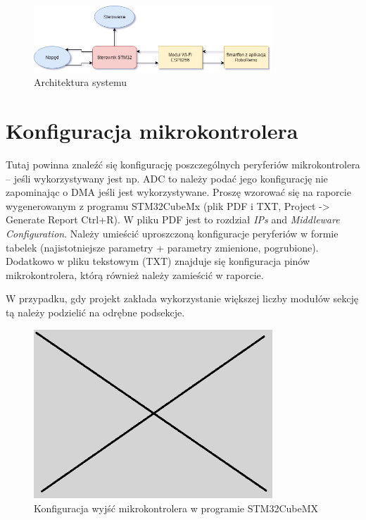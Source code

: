 \documentclass[10pt, a4paper]{article}
\begin{document}
\begin{figure}[H]
	\centering
	\includegraphics[width=0.8\textwidth]{figures/diagram.png}
	\caption{Architektura systemu}
	\label{fig:Architektura}
\end{figure}

\section{Konfiguracja mikrokontrolera}

Tutaj powinna znaleźć się konfigurację poszczególnych peryferiów 
mikrokontrolera -- jeśli wykorzystywany jest np. ADC to należy 
podać jego konfigurację nie zapominając o DMA jeśli jest 
wykorzystywane. Proszę wzorować się na raporcie wygenerowanym 
z programu STM32CubeMx 
(plik PDF i TXT, Project -> Generate Report Ctrl+R). 
W pliku PDF jest to rozdział \textit{IPs} and \textit{Middleware Configuration}. 
Należy umieścić uproszczoną konfiguracje peryferiów w formie 
tabelek (najistotniejsze parametry + parametry zmienione, pogrubione).
Dodatkowo w pliku tekstowym (TXT) znajduje się konfiguracja pinów 
mikrokontrolera, którą również należy zamieścić w raporcie.

W przypadku, gdy projekt zakłada wykorzystanie większej liczby modułów
sekcję tą należy podzielić na odrębne podsekcje.

\begin{figure}[H]
	\centering
	\includegraphics[width=0.8\textwidth]{figures/obraz.png}
	\caption{Konfiguracja wyjść mikrokontrolera w programie STM32CubeMX}
	\label{fig:KonfiguracjaMikrokontrolera}
\end{figure}
\end{document}
